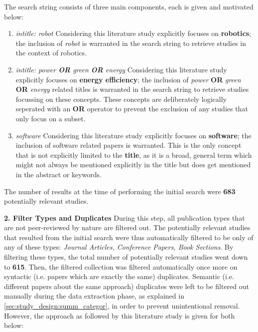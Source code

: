The search string consists of three main components, each is given and motivated below:
\begin{enumerate}
    \item \textit{intitle: robot} \newline
    Considering this literature study explicitly focuses on \textbf{robotics}; 
    the inclusion of \textit{robot} is warranted in the search string to retrieve studies in the context of robotics.

    \item \textit{intitle: power \textbf{OR} green \textbf{OR} energy} \newline 
    Considering this literature study explicitly focuses on \textbf{energy efficiency};
    the inclusion of \textit{power} \textbf{OR} \textit{green} \textbf{OR} \textit{energy} related titles is warranted in the search string to retrieve studies focussing on 
    these concepts.
    These concepts are deliberately logically seperated with an \textbf{OR} operator to prevent the exclusion of any studies that only focus on a subset.

    \item \textit{software} \newline
    Considering this literature study explicitly focuses on \textbf{software};
    the inclusion of software related papers is warranted.
    This is the only concept that is not explicitly limited to the \textbf{title}, as it is a broad, general term which might not always be mentioned
    explicitly in the title but does get mentioned in the abstract or keywords.
    
\end{enumerate}
The number of results at the time of performing the initial search were \textbf{683} potentially relevant studies.

\noindent\textbf{2. Filter Types and Duplicates}
During this step, all publication types that are not peer-reviewed by nature are filtered out. 
The potentially relevant studies that resulted from the initial search were thus automatically filtered to be only of any of these types: 
\textit{Journal Articles, Conference Papers, Book Sections}.
By filtering these types, the total number of potentially relevant studies went down to \textbf{615}. 
Then, the filtered collection was filtered automatically once more on 
syntactic (i.e. papers which are exactly the same) duplicates. 
Semantic (i.e. different papers about the same approach) duplicates were left to be filtered out manually during the data extraction phase, as explained in
\ref{sec:study_design:summ_categor}, in order to prevent unintentional removal. 
However, the approach as followed by this literature study is given for both below:

